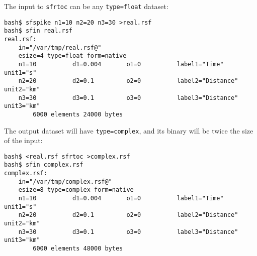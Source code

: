 
\noindent\doublebox{\parbox{\textwidth}{
    
  }}

The input to \texttt{sfrtoc} can be any \texttt{type=float} dataset:
\begin{verbatim}
bash$ sfspike n1=10 n2=20 n3=30 >real.rsf
bash$ sfin real.rsf
real.rsf:
    in="/var/tmp/real.rsf@"
    esize=4 type=float form=native 
    n1=10          d1=0.004       o1=0          label1="Time" unit1="s" 
    n2=20          d2=0.1         o2=0          label2="Distance" unit2="km" 
    n3=30          d3=0.1         o3=0          label3="Distance" unit3="km" 
        6000 elements 24000 bytes
\end{verbatim}
The output dataset will have \texttt{type=complex}, and its binary will be
twice the size of the input:
\begin{verbatim}
bash$ <real.rsf sfrtoc >complex.rsf
bash$ sfin complex.rsf 
complex.rsf:
    in="/var/tmp/complex.rsf@"
    esize=8 type=complex form=native 
    n1=10          d1=0.004       o1=0          label1="Time" unit1="s" 
    n2=20          d2=0.1         o2=0          label2="Distance" unit2="km" 
    n3=30          d3=0.1         o3=0          label3="Distance" unit3="km" 
        6000 elements 48000 bytes
\end{verbatim}

\noindent\doublebox{\parbox{\textwidth}{
    
  }}

